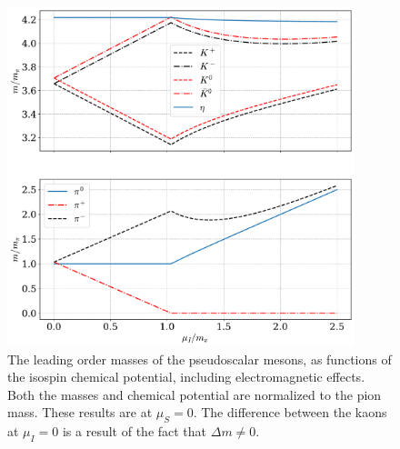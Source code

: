 \begin{figure}[p]
    \centering
    \includegraphics[width=0.9\textwidth]{../scripts/figurer/masses_mesons_EM.pdf}
    \caption{
        The leading order masses of the pseudoscalar mesons, as functions of the isospin chemical potential, including electromagnetic effects.
        Both the masses and chemical potential are normalized to the pion mass.
        These results are at $\mu_S = 0$.
        The difference between the kaons at $\mu_I = 0$ is a result of the fact that $\Delta m \neq 0$.
        }
    \label{fig: leading order masses mesons EM}
\end{figure}
